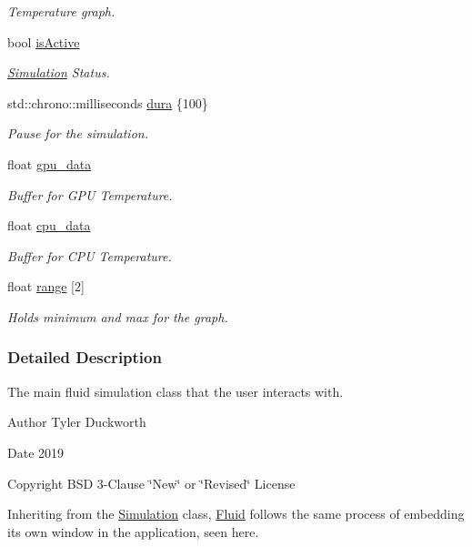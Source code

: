 \begin{DoxyCompactItemize}
\begin{DoxyCompactList}\small\item\em Temperature graph. \end{DoxyCompactList}\item 
bool \mbox{\hyperlink{classFluid_aea07a907844eca27a318311869d31473}{is\+Active}}
\begin{DoxyCompactList}\small\item\em \mbox{\hyperlink{classSimulation}{Simulation}} Status. \end{DoxyCompactList}\item 
std\+::chrono\+::milliseconds \mbox{\hyperlink{classFluid_ab90bfd8344aa2e4cbebda5eee86dcf62}{dura}} \{100\}
\begin{DoxyCompactList}\small\item\em Pause for the simulation. \end{DoxyCompactList}\item 
float \mbox{\hyperlink{classFluid_ad3e877e95bce8f5f779cb87810c39550}{gpu\+\_\+data}}
\begin{DoxyCompactList}\small\item\em Buffer for G\+PU Temperature. \end{DoxyCompactList}\item 
float \mbox{\hyperlink{classFluid_a596fd99b82b4553495b12f353488848e}{cpu\+\_\+data}}
\begin{DoxyCompactList}\small\item\em Buffer for C\+PU Temperature. \end{DoxyCompactList}\item 
float \mbox{\hyperlink{classFluid_a68eb81a3476d8aef975f151e209fe317}{range}} \mbox{[}2\mbox{]}
\begin{DoxyCompactList}\small\item\em Holds minimum and max for the graph. \end{DoxyCompactList}\end{DoxyCompactItemize}


\subsubsection{Detailed Description}
The main fluid simulation class that the user interacts with. 

\begin{DoxyAuthor}{Author}
Tyler Duckworth 
\end{DoxyAuthor}
\begin{DoxyDate}{Date}
2019 
\end{DoxyDate}
\begin{DoxyCopyright}{Copyright}
B\+SD 3-\/Clause \char`\"{}\+New\char`\"{} or \char`\"{}\+Revised\char`\"{} License
\end{DoxyCopyright}
Inheriting from the \mbox{\hyperlink{classSimulation}{Simulation}} class, \mbox{\hyperlink{classFluid}{Fluid}} follows the same process of embedding its own window in the application, seen here. 

